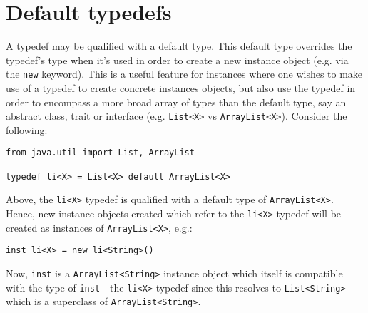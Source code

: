 \documentclass[conc-doc]{subfiles}
\begin{document}
\section{Default typedefs}
A typedef may be qualified with a default type. This default type overrides the typedef's type when it's used in order to create a new instance object (e.g. via the \lstinline{new} keyword). This is a useful feature for instances where one wishes to make use of a typedef to create concrete instances objects, but also use the typedef in order to encompass a more broad array of types than the default type, say an abstract class, trait or interface (e.g. \lstinline{List<X>} vs \lstinline{ArrayList<X>}). Consider the following:
\begin{lstlisting}
from java.util import List, ArrayList

typedef li<X> = List<X> default ArrayList<X>
\end{lstlisting}

Above, the \lstinline{li<X>} typedef is qualified with a default type of \lstinline{ArrayList<X>}. Hence, new instance objects created which refer to the \lstinline{li<X>} typedef will be created as instances of \lstinline{ArrayList<X>}, e.g.:
\begin{lstlisting}
inst li<X> = new li<String>()
\end{lstlisting}

Now, \lstinline{inst} is a \lstinline{ArrayList<String>} instance object which itself is compatible with the type of \lstinline{inst} - the \lstinline{li<X>} typedef since this resolves to \lstinline{List<String>} which is a superclass of \lstinline{ArrayList<String>}.
\end{document}
